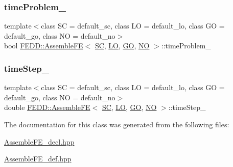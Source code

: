 \subsubsection{\texorpdfstring{time\+Problem\+\_\+}{timeProblem\_}}
{\footnotesize\ttfamily template$<$class SC  = default\+\_\+sc, class LO  = default\+\_\+lo, class GO  = default\+\_\+go, class NO  = default\+\_\+no$>$ \\
bool \hyperlink{classFEDD_1_1AssembleFE}{F\+E\+D\+D\+::\+Assemble\+FE}$<$ \hyperlink{fe__test__laplace_8cpp_a79c7e86a57edbb2a5a53242bcd04e41e}{SC}, \hyperlink{fe__test__laplace_8cpp_ad6a38c9f07d3fd633eefca5bccad8410}{LO}, \hyperlink{fe__test__laplace_8cpp_afa2946b509009b4f45eb04bd8c5b27d9}{GO}, \hyperlink{fe__test__laplace_8cpp_a5e24f37b28787429872b6ecb1d0417ce}{NO} $>$\+::time\+Problem\+\_\+\hspace{0.3cm}{\ttfamily [protected]}}

\mbox{\label{classFEDD_1_1AssembleFE_aedef52d32fc32f3b70877f705968afcc}} 
\subsubsection{\texorpdfstring{time\+Step\+\_\+}{timeStep\_}}
{\footnotesize\ttfamily template$<$class SC  = default\+\_\+sc, class LO  = default\+\_\+lo, class GO  = default\+\_\+go, class NO  = default\+\_\+no$>$ \\
double \hyperlink{classFEDD_1_1AssembleFE}{F\+E\+D\+D\+::\+Assemble\+FE}$<$ \hyperlink{fe__test__laplace_8cpp_a79c7e86a57edbb2a5a53242bcd04e41e}{SC}, \hyperlink{fe__test__laplace_8cpp_ad6a38c9f07d3fd633eefca5bccad8410}{LO}, \hyperlink{fe__test__laplace_8cpp_afa2946b509009b4f45eb04bd8c5b27d9}{GO}, \hyperlink{fe__test__laplace_8cpp_a5e24f37b28787429872b6ecb1d0417ce}{NO} $>$\+::time\+Step\+\_\+\hspace{0.3cm}{\ttfamily [protected]}}



The documentation for this class was generated from the following files\+:\begin{DoxyCompactItemize}
\item 
\hyperlink{AssembleFE__decl_8hpp}{Assemble\+F\+E\+\_\+decl.\+hpp}\item 
\hyperlink{AssembleFE__def_8hpp}{Assemble\+F\+E\+\_\+def.\+hpp}\end{DoxyCompactItemize}
